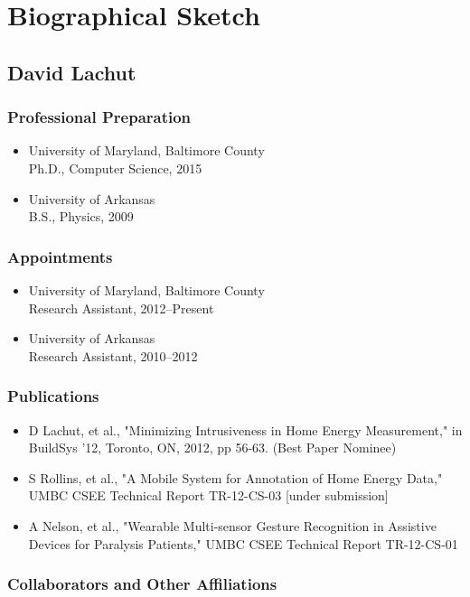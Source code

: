 \section{Biographical Sketch}
  \subsection{David Lachut}
    \subsubsection{Professional Preparation}
      \begin{itemize}
        \item University of Maryland, Baltimore County 
          \\ Ph.D., Computer Science, 2015
        \item University of Arkansas
          \\ B.S., Physics, 2009
      \end{itemize}
    \subsubsection{Appointments}
      \begin{itemize}
        \item University of Maryland, Baltimore County
          \\Research Assistant, 2012--Present
        \item University of Arkansas
          \\Research Assistant, 2010--2012
      \end{itemize}
    \subsubsection{Publications}
      \begin{itemize}
	\item D Lachut, et al., "Minimizing Intrusiveness in Home Energy
	  Measurement," in BuildSys '12, Toronto, ON, 2012, pp 56-63. (Best
	  Paper Nominee)
        \item S Rollins, et al., "A Mobile System for Annotation of Home
	  Energy Data," UMBC CSEE Technical Report TR-12-CS-03 [under
	  submission]
        \item A Nelson, et al., "Wearable Multi-sensor Gesture Recognition in
	  Assistive Devices for Paralysis Patients," UMBC CSEE Technical Report
	  TR-12-CS-01
      \end{itemize}
    \subsubsection{Collaborators and Other Affiliations}

